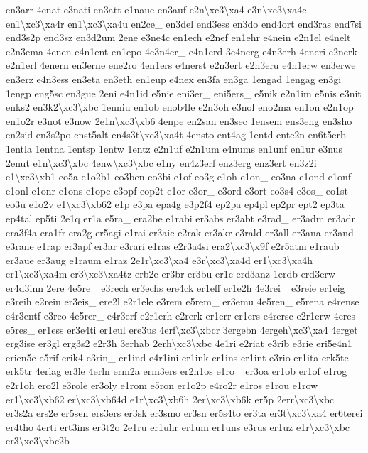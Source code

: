 {en3arr 4enat e3nati en3att e1naue en3auf e2n\textbackslash{}xc3\textbackslash{}xa4 e3n\textbackslash{}xc3\textbackslash{}xa4c en1\textbackslash{}xc3\textbackslash{}xa4r en1\textbackslash{}xc3\textbackslash{}xa4u en2ce\-\_\- en3del end3ess en3do end4ort end3ras end7si end3s2p end3sz en3d2um 2ene e3ne4c en1ech e2nef en1ehr e4nein e2n1el e4nelt e2n3ema 4enen e4n1ent en1epo 4e3n4er\-\_\- e4n1erd 3e4nerg e4n3erh 4eneri e2nerk e2n1erl 4enern en3erne ene2ro 4en1ers e4nerst e2n3ert e2n3eru e4n1erw en3erwe en3erz e4n3ess en3eta en3eth en1eup e4nex en3fa en3ga 1engad 1engag en3gi 1engp eng5sc en3gue 2eni e4n1id e5nie eni3er\-\_\- eni5ers\-\_\- e5nik e2n1im e5nis e3nit enks2 en3k2\textbackslash{}xc3\textbackslash{}xbc 1enniu en1ob enob4le e2n3oh e3nol eno2ma en1on e2n1op en1o2r e3not e3now 2e1n\textbackslash{}xc3\textbackslash{}xb6 4enpe en2san en3sec 1ensem ens3eng en3sho en2sid en3s2po enst5alt en4s3t\textbackslash{}xc3\textbackslash{}xa4t 4ensto ent4ag 1entd ente2n en6t5erb 1entla 1entna 1entsp 1entw 1entz e2n1uf e2n1um e4nums en1unf en1ur e3nus 2enut e1n\textbackslash{}xc3\textbackslash{}xbc 4enw\textbackslash{}xc3\textbackslash{}xbc e1ny en4z3erf enz3erg enz3ert en3z2i e1\textbackslash{}xc3\textbackslash{}xb1 eo5a e1o2b1 eo3ben eo3bi e1of eo3g e1oh e1on\-\_\- eo3na e1ond e1onf e1onl e1onr e1ons e1ope e3opf eop2t e1or e3or\-\_\- e3ord e3ort eo3s4 e3os\-\_\- eo1st eo3u e1o2v e1\textbackslash{}xc3\textbackslash{}xb62 e1p e3pa epa4g e3p2f4 ep2pa ep4pl ep2pr ept2 ep3ta ep4tal ep5ti 2e1q er1a e5ra\-\_\- era2be e1rabi er3abs er3abt e3rad\-\_\- er3adm er3adr era3f4a era1fr era2g er5agi e1rai er3aic e2rak er3akr e3rald er3all er3ana er3and e3rane e1rap er3apf er3ar e3rari e1ras e2r3a4si era2\textbackslash{}xc3\textbackslash{}x9f e2r5atm e1raub er3aue er3aug e1raum e1raz 2e1r\textbackslash{}xc3\textbackslash{}xa4 e3r\textbackslash{}xc3\textbackslash{}xa4d er1\textbackslash{}xc3\textbackslash{}xa4h er1\textbackslash{}xc3\textbackslash{}xa4m er3\textbackslash{}xc3\textbackslash{}xa4tz erb2e er3br er3bu er1c erd3anz 1erdb erd3erw er4d3inn 2ere 4e5re\-\_\- e3rech er3echs ere4ck er1eff er1e2h 4e3rei\-\_\- e3reie er1eig e3reih e2rein er3eis\-\_\- ere2l e2r1ele e3rem e5rem\-\_\- er3emu 4e5ren\-\_\- e5rena e4rense e4r3entf e3reo 4e5rer\-\_\- e4r3erf e2r1erh e2rerk er1err er1ers e4rersc e2r1erw 4eres e5res\-\_\- er1ess er3e4ti er1eul ere3us 4erf\textbackslash{}xc3\textbackslash{}xbcr 3ergebn 4ergeh\textbackslash{}xc3\textbackslash{}xa4 4erget erg3ise er3gl erg3s2 e2r3h 3erhab 2erh\textbackslash{}xc3\textbackslash{}xbc 4e1ri e2riat e3rib e3rie eri5e4n1 erien5e e5rif erik4 e3rin\-\_\- er1ind e4r1ini er1ink er1ins er1int e3rio er1ita erk5te erk5tr 4erlag er3le 4erln erm2a erm3ers er2n1os e1ro\-\_\- er3oa er1ob er1of e1rog e2r1oh ero2l e3role er3oly e1rom e5ron er1o2p e4ro2r e1ros e1rou e1row er1\textbackslash{}xc3\textbackslash{}xb62 er\textbackslash{}xc3\textbackslash{}xb64d e1r\textbackslash{}xc3\textbackslash{}xb6h 2er\textbackslash{}xc3\textbackslash{}xb6k er5p 2err\textbackslash{}xc3\textbackslash{}xbc er3s2a ers2e er5sen ers3ers er3sk er3smo er3sn er5s4to er3ta er3t\textbackslash{}xc3\textbackslash{}xa4 er6terei er4tho 4erti ert3ins er3t2o 2e1ru er1uhr er1um er1uns e3rus er1uz e1r\textbackslash{}xc3\textbackslash{}xbc er3\textbackslash{}xc3\textbackslash{}xbc2b }
